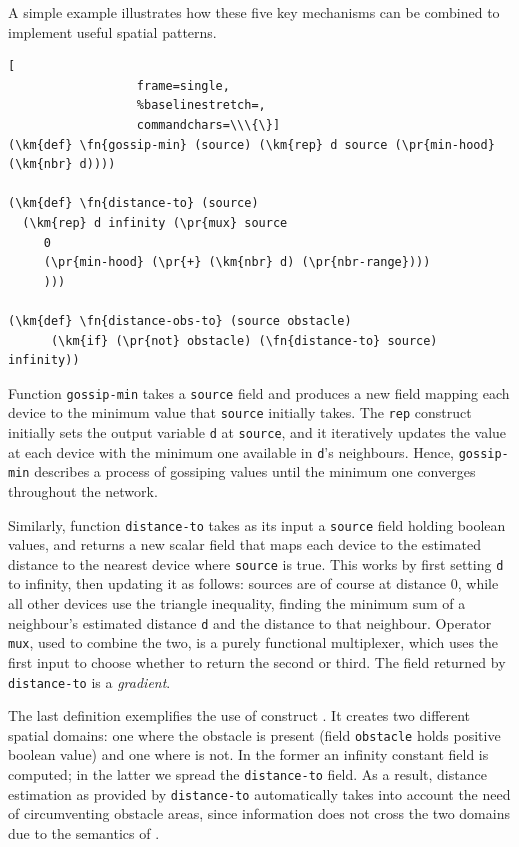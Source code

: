 \documentclass[12pt,a4paper,twoside,openright]{book}
\begin{document}
A simple example illustrates how these five key mechanisms can be combined to implement useful spatial patterns.
%
\begin{samepage}
\begin{Verbatim}[
                  frame=single,
                  %baselinestretch=,
                  commandchars=\\\{\}]
(\km{def} \fn{gossip-min} (source) (\km{rep} d source (\pr{min-hood} (\km{nbr} d))))

(\km{def} \fn{distance-to} (source)
  (\km{rep} d infinity (\pr{mux} source
     0
     (\pr{min-hood} (\pr{+} (\km{nbr} d) (\pr{nbr-range})))
     )))

(\km{def} \fn{distance-obs-to} (source obstacle)
      (\km{if} (\pr{not} obstacle) (\fn{distance-to} source) infinity))
\end{Verbatim}
\end{samepage}
%
Function {\tt gossip-min} takes a {\tt source} field and produces a new field mapping each device to the minimum value that {\tt source} initially takes.
%
The {\tt rep} construct initially sets the output variable {\tt d} at {\tt source}, and it iteratively updates the value at each device with the minimum one available in {\tt d}'s neighbours.
%
Hence, {\tt gossip-min} describes a process of gossiping values until the minimum one converges throughout the network.

Similarly, function {\tt distance-to} takes as its input a {\tt source} field holding boolean values, and returns a new scalar field that maps each device to the estimated distance to the nearest device where {\tt source} is true.
%
This works by first setting {\tt d} to infinity, then updating it as follows: sources are of course at distance $0$, while all other devices use the triangle inequality, finding the minimum sum of a neighbour's estimated distance {\tt d} and the distance to that neighbour.
%
Operator \texttt{mux}, used to combine the two, is a purely functional multiplexer, which uses the first input to choose whether to return the second or third.
%
The field returned by {\tt distance-to} is a \emph{gradient}.

The last definition exemplifies the use of construct \texttt{\ifN}. It creates two different spatial domains: one where the obstacle is present (field {\tt obstacle} holds positive boolean value) and one where is not. In the former an infinity constant field is computed; in the latter we spread the {\tt distance-to} field.
%
As a result, distance estimation as provided by {\tt distance-to} automatically takes into account the need of circumventing obstacle areas, since information does not cross the two domains due to the semantics of \texttt{\nbrN}.
\end{document}
